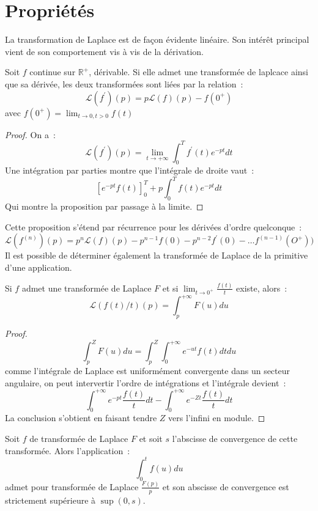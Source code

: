 \section{Propriétés}
La transformation de Laplace est de façon évidente linéaire. Son
intérêt principal vient de son comportement vis à vis de la
dérivation.
\begin{mandatory}
\begin{prop}
Soit $f$ continue sur $\mathbb{R}^+$, dérivable. Si elle admet une
transformée de laplcace ainsi que sa dérivée, les deux transformées
sont liées par la relation~:
\[
\mathcal{L}(f^\prime)(p) = p \mathcal{L}(f)(p) - f(0^+)
\] 
avec $f(0^+) = \lim_{ t \to 0, t > 0} f(t)$
\end{prop}
\end{mandatory}
\begin{proof}
On a~:
\[
\mathcal{L}(f^\prime)(p) = \lim_{t\to + \infty} \int_0^Tf^\prime(t) e^{-pt} dt
\]
Une intégration par parties montre que l'intégrale de droite vaut~:
\[
\left [
e^{-pt}f(t)
\right ]_0^T
+ p \int_0^T f(t) e^{-pt} dt
\]
Qui montre la proposition par passage à la limite.
\end{proof}
Cette proposition s'étend par récurrence pour les dérivées d'ordre
quelconque~:
\[
\mathcal{L}(f^{(n)})(p) = p^n \mathcal{L}(f)(p) - p^{n-1} f(0)
- p^{n-2} f^\prime(0) - \dots f^{(n-1)}(O^+))
\]
Il est possible de déterminer également la transformée de Laplace de
la primitive d'une application.
\begin{mandatory}
\begin{prop}
Si $f$ admet une transformée de Laplace $F$ et si $\lim_{t \to 0^+}
\frac{f(t)}{t}$ existe, alors~:
\[
\mathcal{L}(f(t)/t)(p) = \int_p^{+\infty} F(u) du
\]
\end{prop} 
\end{mandatory}
\begin{proof}
\[
\int_p^Z F(u) du = \int_p^Z \int_0^{+\infty} e^{-ut}
f(t) dt du
\]
comme l'intégrale de Laplace est uniformément convergente dans un
secteur angulaire, on peut intervertir l'ordre de intégrations et
l'intégrale devient~:
\[
\int_0^{+\infty} e^{-pt} \frac{f(t)}{t} dt - \int_0^{+\infty} e^{-Zt} \frac{f(t)}{t} dt
\] 
La conclusion s'obtient en faisant tendre $Z$ vers l'infini en module.
\end{proof}
\begin{mandatory}
\begin{prop}
Soit $f$ de transformée de Laplace $F$ et soit $s$ l'abscisse de
convergence de cette transformée. Alors l'application~:
\[
\int_0^t f(u) du
\]
admet pour transformée de Laplace $\frac{F(p)}{p}$ et son abscisse de
convergence est strictement supérieure à $\sup(0, s)$.
\end{prop}
\end{mandatory}
